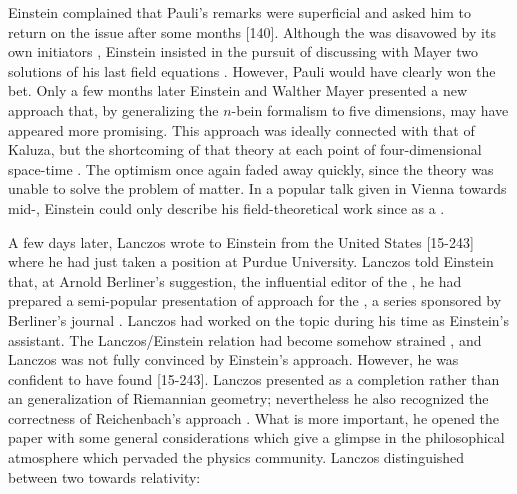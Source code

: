 \documentclass[draft]{article}
\newcommand{\nbein}{$n$-bein\xspace}
\newcommand{\FP}{\german{Fernparallelismus}\xspace}
\begin{document}

Einstein complained that Pauli's remarks were superficial and asked him to return on the issue after some months [140]. Although the \uftp was disavowed by its own initiators \citep{Weyl1931}, Einstein insisted in the pursuit of \FP discussing with Mayer two solutions of his last field equations \citep{Einstein1930g}. However, Pauli would have clearly won the bet. Only a few months later Einstein and Walther Mayer presented a new approach \citep{Einstein1931} that, by generalizing the \nbein formalism to five dimensions, may have appeared more promising. This approach was ideally connected with that of Kaluza, but the shortcoming of that theory  at each point of four-dimensional space-time \citep[377]{Einstein1931}. The optimism once again faded away quickly, since the theory was unable to solve the problem of matter. In a popular talk given in Vienna towards mid-, Einstein could only describe his field-theoretical work since \gr as a  \citep[441]{Einstein1932b}.

A few days later, Lanczos wrote to Einstein from the United States [15-243] where he had just taken a position at Purdue University. Lanczos told Einstein that, at Arnold Berliner's suggestion, the influential editor of the , he had prepared a semi-popular presentation of \FP approach for the , a series sponsored by Berliner's journal \citep{Lanczos1931}. Lanczos had worked on the topic during his time as Einstein's assistant. The Lanczos/Einstein relation had become somehow strained \citep{Stachel1994}, and Lanczos was not fully convinced by Einstein's approach. However, he was confident to have found  [15-243]. Lanczos presented \FP as a completion rather than an generalization of Riemannian geometry; nevertheless he also recognized the correctness of Reichenbach's approach \citep[118]{Lanczos1931}. What is more important, he opened the paper with some general considerations which give a glimpse in the philosophical atmosphere which pervaded the physics community. Lanczos distinguished between two  towards relativity: 
\end{document}

